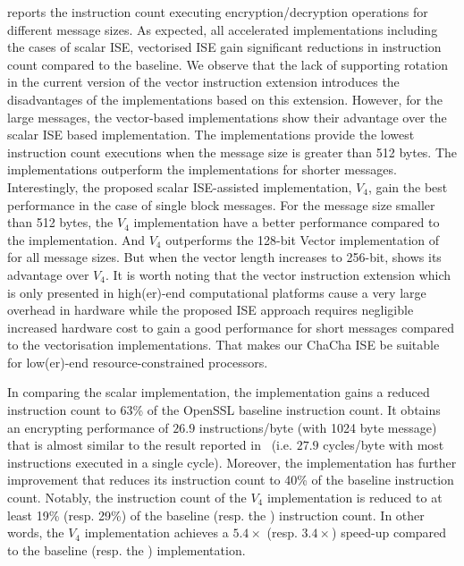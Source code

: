  reports the instruction count executing encryption/decryption operations for different message sizes. 
As expected, all accelerated implementations including the cases of scalar ISE, vectorised ISE gain significant reductions in instruction count compared to the baseline. 
We observe that the lack of supporting rotation in the current version of the vector instruction extension introduces the disadvantages of the implementations based on this extension. 
However, for the large messages, the vector-based implementations show their advantage over the scalar ISE based implementation. 
The  implementations provide the lowest instruction count executions when the message size is greater than 512 bytes. 
The  implementations outperform the  implementations for shorter messages.
Interestingly, the proposed scalar ISE-assisted implementation, $V_4$, gain the best performance in the case of single block messages.
For the message size smaller than 512 bytes, the $V_4$ implementation have a better performance compared to the  implementation. 
And $V_4$ outperforms the 128-bit Vector implementation of  for all message sizes. But when the vector length increases to 256-bit,  shows its advantage over $V_4$. It is worth noting that the vector instruction extension which is only presented in high(er)-end computational platforms cause a very large overhead in hardware while the proposed ISE approach requires negligible increased hardware cost to gain a good performance for short messages compared to the vectorisation implementations. That makes our ChaCha ISE be suitable for low(er)-end resource-constrained processors.

In comparing the scalar implementation, the  implementation gains a reduced instruction count to 63\% of the OpenSSL baseline instruction count.
It obtains an encrypting performance of $26.9$ instructions/byte (with 1024 byte message) that is almost similar to the result reported in~\cite{Sto:19} (i.e. $27.9$ cycles/byte with most instructions executed in a single cycle). Moreover, the  implementation has further improvement that reduces its instruction count to 40\% of the baseline instruction count.
Notably, the instruction count of the $V_4$ implementation is reduced to at least 19\% (resp. 29\%) of the baseline (resp. the ) instruction count. In other words, the $V_4$ implementation achieves a $5.4\times$ (resp. $3.4\times$) speed-up compared to the baseline (resp. the ) implementation.

